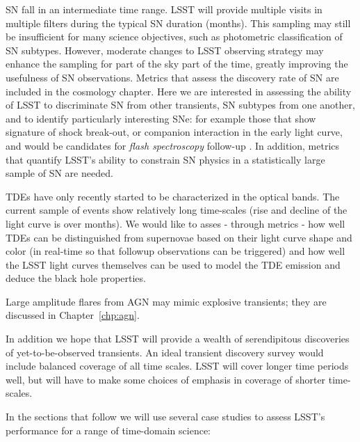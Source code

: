 SN fall in an intermediate time range.  LSST will provide
multiple visits in multiple filters during the typical SN duration
(months).  This sampling may still be insufficient for many science
objectives, such as photometric classification of SN subtypes.  
However, moderate changes to LSST
observing strategy may enhance the sampling for part of the sky part
of the time, greatly improving the usefulness of SN observations. 
Metrics that assess the discovery rate of SN are included in the
cosmology chapter. Here we are interested in assessing the ability of
LSST to discriminate SN from other transients, SN subtypes from one
another, and to identify particularly interesting SNe: for example
those that show signature of shock break-out, or companion interaction
in the early light curve, and would be candidates for \emph{flash
spectroscopy} follow-up \citep[e.g.,][]{2014Natur.509..471G}. 
In addition, metrics that
quantify LSST's ability to constrain SN physics in a statistically
large sample of SN are needed.

TDEs have only recently started to be characterized in the optical
bands. The current sample of events show relatively long
time-scales (rise and decline of the light curve is over months). We
would like to asses - through metrics - how well TDEs can be
distinguished from supernovae based on their light curve shape and
color (in real-time so that followup observations can be triggered)
and how well the LSST light curves themselves can be used to model the
TDE emission and deduce the black hole properties.  

Large amplitude flares from AGN may mimic
explosive transients; they are discussed in Chapter~\ref{chp:agn}.

In addition we hope that LSST will provide a wealth of serendipitous
discoveries of yet-to-be-observed transients.  An ideal transient
discovery survey would include balanced coverage of all time scales. LSST
will cover longer time periods well, but will have to make some
choices of emphasis in coverage of shorter time-scales. 

In the sections that follow we will use several case studies to assess
LSST's performance for a range of time-domain science:

